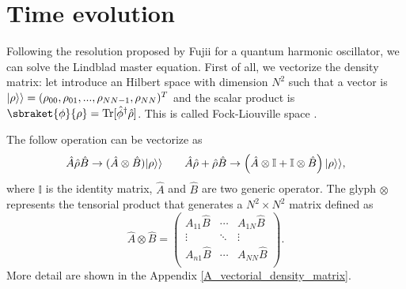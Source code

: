 \section{Time evolution}
Following the resolution proposed by Fujii \cite{fujii2012} for a quantum harmonic oscillator, we can solve the Lindblad master equation. 
First of all, we vectorize the density matrix: let introduce an Hilbert space with dimension $N^2$ such that a vector is $\lvert\rho\rangle\rangle = (\rho_{00},\rho_{01},...,\rho_{NN-1},\rho_{NN})^T$ and the scalar product is $\sbraket{\phi}{\rho}= \Tr[\hat\phi^\dagger\hat\rho]$. This is called Fock-Liouville space \cite{Manzano}.

The follow operation can be vectorize as
\begin{equation}
    \hat A \hat\rho \hat B \rightarrow (\hat A\otimes\hat B)\lvert\rho\rangle\rangle \qquad \hat A \hat\rho +\hat\rho\hat B \rightarrow \left(\hat A\otimes\mathbb{I} +\mathbb{I}\otimes\hat B\right)\lvert\rho\rangle\rangle,
\end{equation}
where $\mathbb{I}$ is the identity matrix, $\hat A$ and $\hat B$ are two generic operator. The glyph $\otimes$ represents the tensorial product that generates a $N^2\times N^2$ matrix defined as
\begin{equation}
    \hat A\otimes\hat B = \begin{pmatrix}
        A_{11} \hat B & \cdots & A_{1N}\hat B\\
        \vdots & \ddots &\vdots\\
        A_{n1}\hat B& \cdots & A_{NN}\hat B\\
    \end{pmatrix}.
\end{equation}
More detail are shown in the Appendix \ref{A_vectorial_density_matrix}.

